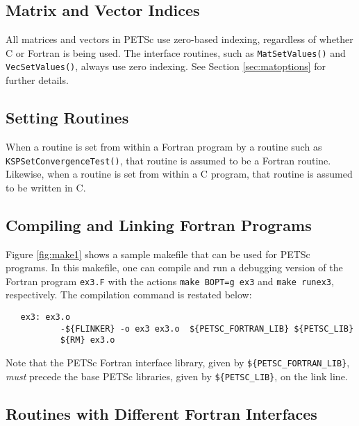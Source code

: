 \subsection{Matrix and Vector Indices}

All matrices and vectors in PETSc use zero-based indexing, regardless
of whether C or Fortran is being used.  The interface routines, such
as {\tt MatSetValues()} and {\tt VecSetValues()}, always use zero
indexing.  See Section \ref{sec:matoptions} for further details.

\subsection{Setting Routines}

When a routine is set from within a Fortran program by a routine such
as {\tt KSPSetConvergenceTest()}, that routine is assumed to be a
Fortran routine. Likewise, when a routine is set from within a C
program, that routine is assumed to be written in C.

\subsection{Compiling and Linking Fortran Programs}
\label{sec:fortcompile}

Figure \ref{fig:make1} shows a sample makefile that can be used for
PETSc programs.  In this makefile, one can compile and run a debugging version
of the Fortran program {\tt ex3.F} with the actions {\tt make BOPT=g ex3} and
{\tt make runex3}, respectively. The compilation command is restated below:
\begin{verbatim}
   ex3: ex3.o 
           -${FLINKER} -o ex3 ex3.o  ${PETSC_FORTRAN_LIB} ${PETSC_LIB}
           ${RM} ex3.o
\end{verbatim}
Note that the PETSc Fortran interface library, given by 
{\tt \$\{PETSC\_FORTRAN\_LIB\}}, {\em must}   precede
the base PETSc libraries, given by {\tt \$\{PETSC\_LIB\}}, 
on the link line.

\subsection{Routines with Different Fortran Interfaces}
\label{sec:fortran_exceptions}

